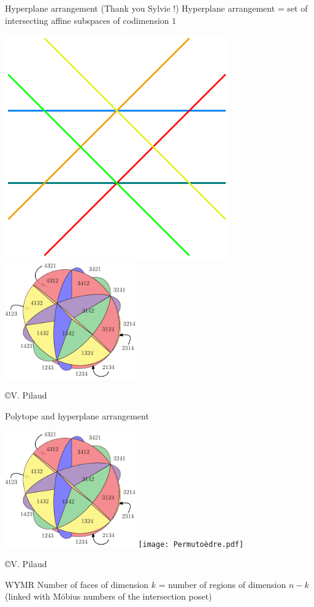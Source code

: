 \documentclass[slidetop,11pt %
]{beamer}
\theoremstyle{definition}
\begin{document}
\begin{frame}{Hyperplane arrangement (Thank you Sylvie !)}
Hyperplane arrangement = set of intersecting affine subspaces of codimension $1$



\begin{center}
\includegraphics{arr.pdf}\includegraphics[height=5cm]{braidFan.pdf}
\end{center}
\begin{flushright}
\footnotesize \copyright V. Pilaud 
\end{flushright}
\end{frame}

\begin{frame}{Polytope and hyperplane arrangement}
\begin{center}
\includegraphics[height=5cm]{braidFan.pdf}
\texttt{[image: Permutoèdre.pdf]}
\end{center}
\footnotesize \copyright V. Pilaud
\normalsize
\begin{block}{WYMR}
Number of faces of dimension $k$ = number of regions of dimension $n-k$ \textcolor{part2}{(linked with Möbius numbers of the intersection poset)}
\end{block}
\end{frame}
\end{document}
